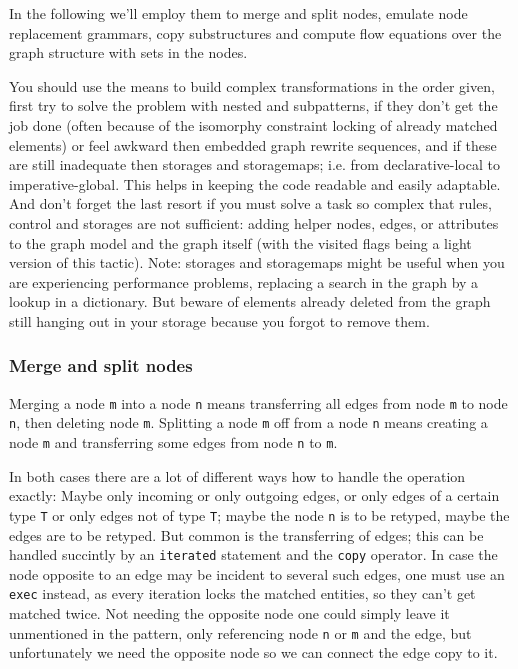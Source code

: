 \noindent In the following we'll employ them to merge and split nodes, emulate node replacement grammars, copy substructures and compute flow equations over the graph structure with sets in the nodes.

\begin{note}
You should use the means to build complex transformations in the order given, first try to solve the problem with nested and subpatterns, if they don't get the job done (often because of the isomorphy constraint locking of already matched elements) or feel awkward then embedded graph rewrite sequences, and if these are still inadequate then storages and storagemaps; i.e. from declarative-local to imperative-global. This helps in keeping the code readable and easily adaptable. And don't forget the last resort if you must solve a task so complex that rules, control and storages are not sufficient: adding helper nodes, edges, or attributes to the graph model and the graph itself (with the visited flags being a light version of this tactic). Note: storages and storagemaps might be useful when you are experiencing performance problems, replacing a search in the graph by a lookup in a dictionary. But beware of elements already deleted from the graph still hanging out in your storage because you forgot to remove them.
\end{note}

\subsubsection*{Merge and split nodes}
Merging a node \texttt{m} into a node \texttt{n} means transferring all edges from node \texttt{m} to node \texttt{n}, then deleting node \texttt{m}. 
Splitting a node \texttt{m} off from a node \texttt{n} means creating a node \texttt{m} and transferring some edges from node \texttt{n} to \texttt{m}.

In both cases there are a lot of different ways how to handle the operation exactly:
Maybe only incoming or only outgoing edges, or only edges of a certain type \texttt{T} or only edges not of type \texttt{T}; maybe the node \texttt{n} is to be retyped, maybe the edges are to be retyped. 
But common is the transferring of edges; this can be handled succintly by an \texttt{iterated} statement and the \texttt{copy} operator.
In case the node opposite to an edge may be incident to several such edges, one must use an \texttt{exec} instead, as every iteration locks the matched entities, so they can't get matched twice. Not needing the opposite node one could simply leave it unmentioned in the pattern, only referencing node \texttt{n} or \texttt{m} and the edge, but unfortunately we need the opposite node so we can connect the edge copy to it.

